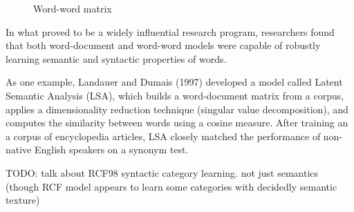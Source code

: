 \documentclass[man,floatsintext]{apa6}
\begin{document}
\begin{figure}
  \begin{center}
    \footnotesize{}
    \caption{Word-word matrix}
    \label{matrix-word-word}
  \end{center}
\end{figure}

In what proved to be a widely influential research program,
researchers found that both word-document and word-word models were
capable of robustly learning semantic and syntactic properties of words.

As one example, Landauer and Dumais (1997) developed a model called
Latent Semantic Analysis (LSA), which builds a word-document
matrix from a corpus, applies a dimensionality reduction technique
(singular value decomposition), and computes the similarity between
words using a cosine measure. After training an a corpus of
encyclopedia articles, LSA closely matched the performance of
non-native English speakers on a synonym test.

TODO: talk about RCF98 syntactic category learning. not just semantics
(though RCF model appears to learn some categories with decidedly
semantic texture)
\end{document}

